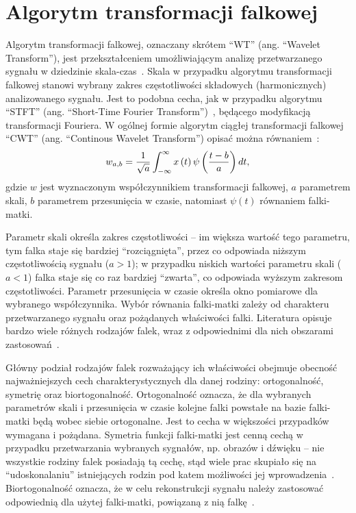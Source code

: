 \chapter{Algorytm transformacji falkowej}

Algorytm transformacji falkowej, oznaczany skrótem \enquote{WT} (ang. \enquote{Wavelet Transform}), jest przekształceniem umożliwiającym analizę przetwarzanego sygnału w dziedzinie skala-czas~\cite{wallen_handbook}. Skala w przypadku algorytmu transformacji falkowej stanowi wybrany zakres częstotliwości składowych (harmonicznych) analizowanego sygnału. Jest to podobna cecha, jak w przypadku algorytmu \enquote{STFT} (ang. \enquote{Short-Time Fourier Transform})~\cite{durak_sftp}, będącego modyfikacją transformacji Fouriera. W ogólnej formie algorytm ciągłej transformacji falkowej \enquote{CWT} (ang. \enquote{Continous Wavelet Transform}) opisać można równaniem~\cite{lord_guide, wallen_handbook}:
\begin{equation}
w_{a,b} = \frac{1}{\sqrt{a}} \int _{-\infty} ^{\infty} x \left(t\right) \psi \left(\frac{t-b}{a}\right) dt \label{eq:cwt},
\end{equation}
gdzie $w$ jest wyznaczonym współczynnikiem transformacji falkowej, $a$ parametrem skali, $b$ parametrem przesunięcia w czasie, natomiast $\psi(t)$ równaniem falki-matki.

Parametr skali określa zakres częstotliwości -- im większa wartość tego parametru, tym falka staje się bardziej \enquote{rozciągnięta}, przez co odpowiada niższym częstotliwością sygnału ($a > 1$); w przypadku niskich wartości parametru skali ($a < 1$) falka staje się co raz bardziej \enquote{zwarta}, co odpowiada wyższym zakresom częstotliwości. Parametr przesunięcia w czasie określa okno pomiarowe dla wybranego współczynnika. Wybór równania falki-matki zależy od charakteru przetwarzanego sygnału oraz pożądanych właściwości falki. Literatura opisuje bardzo wiele różnych rodzajów falek, wraz z odpowiednimi dla nich obszarami zastosowań~\cite{wallen_handbook, akujuobi_applications, lord_guide}.

Główny podział rodzajów falek rozważający ich właściwości obejmuje obecność najważniejszych cech charakterystycznych dla danej rodziny: ortogonalność, symetrię oraz biortogonalność. Ortogonalność oznacza, że dla wybranych parametrów skali i przesunięcia w czasie kolejne falki powstałe na bazie falki-matki będą wobec siebie ortogonalne. Jest to cecha w większości przypadków wymagana i pożądana. Symetria funkcji falki-matki jest cenną cechą w przypadku przetwarzania wybranych sygnałów, np. obrazów i dźwięku -- nie wszystkie rodziny falek posiadają tą cechę, stąd wiele prac skupiało się na \enquote{udoskonalaniu} istniejących rodzin pod katem możliwości jej wprowadzenia~\cite{reddy_compression}. Biortogonalność oznacza, że w celu rekonstrukcji sygnału należy zastosować odpowiednią dla użytej falki-matki, powiązaną z nią falkę~\cite{sweldens_bior}.

